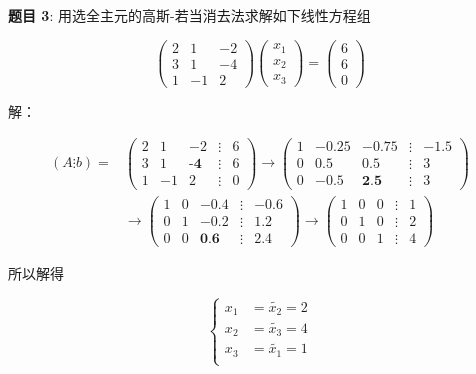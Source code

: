\documentclass{article}
\begin{document}
\noindent\textbf{题目 3}: 用选全主元的高斯-若当消去法求解如下线性方程组

$$
\begin{pmatrix}
    2 & 1 & -2 \\
    3 & 1 & -4 \\
    1 & -1 & 2
\end{pmatrix}
\begin{pmatrix}
    x_1 \\
    x_2 \\
    x_3
\end{pmatrix}
=
\begin{pmatrix}
    6 \\
    6 \\
    0
\end{pmatrix}
$$

\noindent 解：

$$
\begin{aligned}
(A\vdots b)
=&
\begin{pmatrix}
    2 & 1 & -2 & \vdots & 6 \\
    3 & 1 & \textbf{-4} & \vdots & 6 \\
    1 & -1 & 2 & \vdots & 0
\end{pmatrix}
\longrightarrow
\begin{pmatrix}
    1 & -0.25 & -0.75 & \vdots & -1.5 \\
    0 & 0.5 & 0.5 & \vdots & 3 \\
    0 & -0.5 & \textbf{2.5} & \vdots & 3
\end{pmatrix}
\\
&\longrightarrow
\begin{pmatrix}
    1 & 0 & -0.4 & \vdots & -0.6 \\
    0 & 1 & -0.2 & \vdots & 1.2 \\
    0 & 0 & \textbf{0.6} & \vdots & 2.4
\end{pmatrix}
\longrightarrow
\begin{pmatrix}
    1 & 0 & 0 & \vdots & 1 \\
    0 & 1 & 0 & \vdots & 2 \\
    0 & 0 & 1 & \vdots & 4
\end{pmatrix}
\end{aligned}
$$

所以解得

$$
\left\{
\begin{aligned}
    x_1 &= \widetilde{x_2} = 2 \\
    x_2 &= \widetilde{x_3} = 4 \\
    x_3 &= \widetilde{x_1} = 1 \\
\end{aligned}
\right.
$$\\
\end{document}
